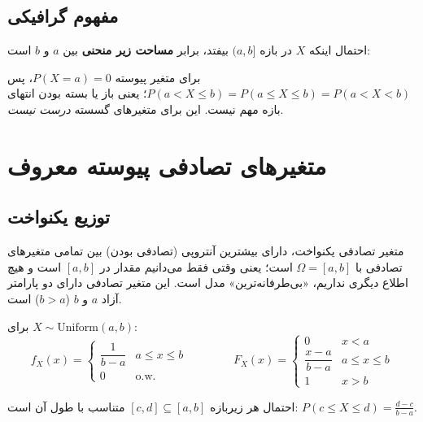 \subsection{مفهوم گرافیکی}
احتمال اینکه $X$ در بازه $(a,b]$ بیفتد، برابر \textbf{مساحت زیر منحنی}  بین $a$ و $b$ است:

\begin{center}
\end{center}

\begin{note}
\notetitle برای متغیر پیوسته $P(X=a)=0$، پس $P(a<X\le b)=P(a\le X\le b)=P(a<X<b)$؛ یعنی باز یا بسته بودن انتهای بازه مهم نیست. این برای متغیرهای گسسته \emph{درست نیست}.
\end{note}

\section{متغیرهای تصادفی پیوسته معروف}

\subsection{توزیع یکنواخت }
متغیر تصادفی یکنواخت، دارای بیشترین آنتروپی (تصادفی بودن) بین تمامی متغیرهای تصادفی با $\Omega=[a,b]$ است؛ یعنی وقتی فقط می‌دانیم مقدار در $[a,b]$ است و هیچ اطلاع دیگری نداریم، «بی‌طرفانه‌ترین» مدل است. این متغیر تصادفی دارای دو پارامتر آزاد $a$ و $b$ ($b>a$) است.

\begin{definition}
برای $X\sim\mathrm{Uniform}(a,b)$:
\[
f_X(x)=\begin{cases}\dfrac{1}{b-a} & a\le x\le b\\[2mm] 0 & \text{o.w.}\end{cases}
\qquad\qquad
F_X(x)=\begin{cases}0 & x<a\\ \dfrac{x-a}{b-a} & a\le x\le b\\ 1 & x>b\end{cases}
\]
\end{definition}
احتمال هر زیربازه $[c,d]\subseteq[a,b]$ متناسب با طول آن است: $P(c\le X\le d)=\frac{d-c}{b-a}$.

